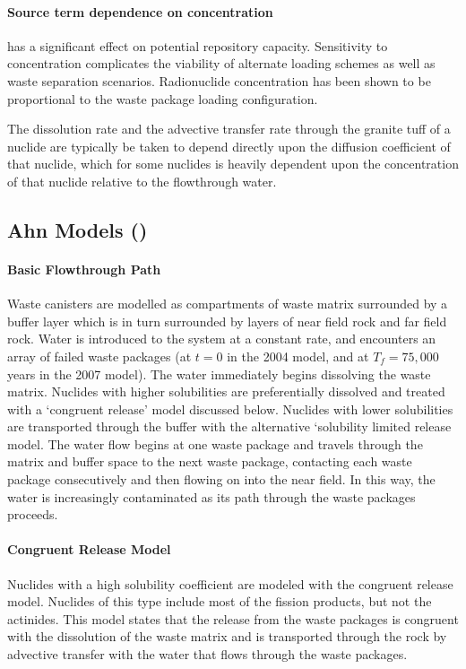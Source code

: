 \paragraph{Source term dependence on concentration} has a significant effect on potential repository capacity. Sensitivity to concentration complicates the viability of alternate loading schemes as well as waste separation scenarios. Radionuclide concentration has been shown to be proportional to the waste package loading configuration.\cite{AhnConfig2,AhnConfig}

The dissolution rate and the advective transfer rate through the granite tuff of a nuclide are typically be taken to depend directly upon the diffusion coefficient of that nuclide, which for some nuclides is heavily dependent upon the concentration of that nuclide relative to the flowthrough water. 

\subsection{Ahn Models (\cite{Ahn2004, Ahn2007})}
\paragraph{Basic Flowthrough Path}
Waste canisters are modelled as compartments of waste matrix surrounded by a buffer layer which is in turn surrounded by layers of near field rock and far field rock. Water is introduced to the system at a constant rate, and encounters an array of failed waste packages (at $t=0$ in the 2004 model, and at $T_f=75,000$ years in the 2007 model). The water immediately begins dissolving the waste matrix. Nuclides with higher solubilities are preferentially dissolved and treated with a `congruent release' model discussed below. Nuclides with lower solubilities are transported through the buffer with the alternative `solubility limited release model. The water flow begins at one waste package and travels through the matrix and buffer space to the next waste package, contacting each waste package consecutively and then flowing on into the near field. In this way, the water is increasingly contaminated as its path through the waste packages proceeds.  
\paragraph{Congruent Release Model} 
Nuclides with a high solubility coefficient are modeled with the congruent release model. Nuclides of this type include most of the fission products, but not the actinides. This model states that the release from the waste packages is congruent with the dissolution of the waste matrix and is transported through the rock by advective transfer with the water that flows through the waste packages.  

